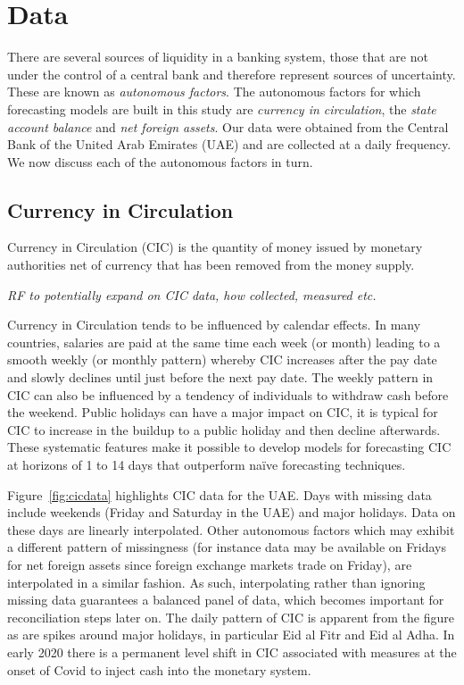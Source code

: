 \section{Data}\label{sec:data}

There are several sources of liquidity in a banking system, those that are not
under  the control  of  a  central bank  and  therefore  represent sources  of
uncertainty. These  are known as \textit{autonomous  factors}.  The autonomous
factors  for   which  forecasting   models  are  built   in  this   study  are
\textit{currency  in  circulation},  the \textit{state  account  balance}  and
\textit{net foreign assets}.  Our data were  obtained from the Central Bank of
the United Arab Emirates (UAE) and are  collected at a daily frequency. We now
discuss each of the autonomous factors in turn.

\subsection{Currency in Circulation}

Currency in  Circulation (CIC)  is the  quantity of  money issued  by monetary
authorities net of currency that has been removed from the money supply.

\textit{\color{blue}  RF to  potentially expand  on CIC  data, how  collected,
measured etc.}

Currency in Circulation  tends to be influenced by calendar  effects.  In many
countries, salaries are paid at the same  time each week (or month) leading to
a smooth weekly (or monthly pattern)  whereby CIC increases after the pay date
and slowly declines until just before the next pay date. The weekly pattern in
CIC  can also  be influenced  by a  tendency of  individuals to  withdraw cash
before the  weekend. Public  holidays can have  a major impact  on CIC,  it is
typical  for CIC  to increase  in the  buildup to  a public  holiday and  then
decline  afterwards. These  systematic features  make it  possible to  develop
models for forecasting CIC at horizons of 1 to 14 days that outperform na\"ive
forecasting techniques.

Figure~\ref{fig:cicdata} highlights  CIC data for  the UAE. Days  with missing
data include  weekends (Friday and  Saturday in  the UAE) and  major holidays.
Data on these  days are linearly interpolated. Other  autonomous factors which
may  exhibit a  different pattern  of missingness  (for instance  data may  be
available on  Fridays for  net foreign assets  since foreign  exchange markets
trade  on  Friday),   are  interpolated  in  a  similar   fashion.   As  such,
interpolating rather than ignoring missing data guarantees a balanced panel of
data, which  becomes important for  reconciliation steps later on.   The daily
pattern  of  CIC is  apparent  from  the figure  as  are  spikes around  major
holidays, in particular Eid al Fitr and Eid  al Adha. In early 2020 there is a
permanent level shift in CIC associated with measures at the onset of Covid to
inject cash into the monetary system.

